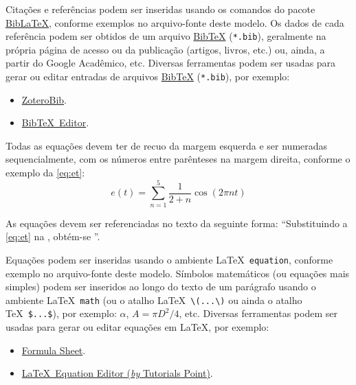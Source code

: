 \documentclass[%
  a4paper,%
  12pt,%
  fleqn,%
  english,%
  brazilian,%
]{article}
\begin{document}
Citações e referências podem ser inseridas usando os comandos do pacote \href{https://ctan.org/pkg/biblatex/}{Bib\LaTeX\LinkIcon}, conforme exemplos no arquivo-fonte deste modelo.
Os dados de cada referência podem ser obtidos de um arquivo \href{https://www.bibtex.org/}{Bib\TeX\LinkIcon} (\texttt{*.bib}), geralmente na própria página de acesso ou  da publicação (artigos, livros, etc.) ou, ainda, a partir do Google Acadêmico, etc.
Diversas ferramentas podem ser usadas para gerar ou editar entradas de arquivos \href{https://www.bibtex.org/}{Bib\TeX\LinkIcon} (\texttt{*.bib}), por exemplo:

\begin{itemize}
\item \href{https://zbib.org/}{ZoteroBib\LinkIcon}.
\item \href{https://truben.no/latex/bibtex/}{Bib\TeX\ Editor\LinkIcon}.
\end{itemize}

Todas as equações devem ter  de recuo da margem esquerda e ser numeradas sequencialmente, com os números entre parênteses na margem direita, conforme o exemplo da \cref{eq:et}:
\begin{equation}%
\label{eq:et}
e{\left(t\right)} = \sum_{n = 1}^5 \frac{1}{2 + n} \cos{\left(2 \pi n t\right)}
\end{equation}

As equações devem ser referenciadas no texto da seguinte forma: \enquote{Substituindo a \cref{eq:et} na \textelp{}, obtém-se \textelp{}}.

Equações podem ser inseridas usando o ambiente \LaTeX\ \texttt{equation}, conforme exemplo no arquivo-fonte deste modelo.
Símbolos matemáticos (ou equações mais simples) podem ser inseridos ao longo do texto de um parágrafo usando o ambiente \LaTeX\ \texttt{math} (ou o atalho \LaTeX\ \verb|\(...\)| ou ainda o atalho \TeX\ \verb|$...$|), por exemplo: $\alpha$, $A = \pi D^2 / 4$, etc.
Diversas ferramentas podem ser usadas para gerar ou editar equações em \LaTeX, por exemplo:

\begin{itemize}
\item \href{https://formulasheet.com/}{Formula Sheet\LinkIcon}.
\item \href{https://www.tutorialspoint.com/latex_equation_editor.htm}{\LaTeX\ Equation Editor (\textit{by} Tutorials Point)\LinkIcon}.
\end{itemize}
\end{document}
